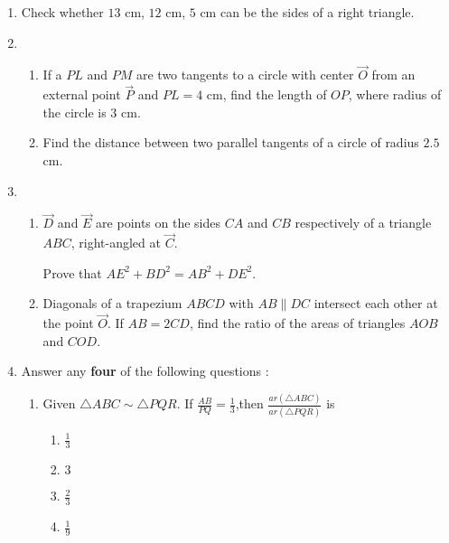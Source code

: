 %
\begin{enumerate}[label=\thesection.\arabic*.,ref=\thesection.\theenumi]
\item Check whether $13$ cm, $12$ cm, $5$ cm can be the sides of a right triangle.
\item \begin{enumerate}
    \item If a $PL$ and $PM$ are two tangents to a circle with center $\vec{O}$ from an external point $\vec{P}$ and $PL=4$ cm, find the length of $OP$, where radius of the circle is $3$ cm.
    \item Find the distance between two parallel tangents of a circle of radius $2.5$ cm.
\end{enumerate}
    \item 
    \begin{enumerate}
    \item $\vec{D}$ and $\vec{E}$ are points on the sides $CA$ and $CB$ respectively of  a triangle $ABC$, right-angled at $\vec{C}$.
    
    Prove that $AE^2+BD^2=AB^2+DE^2$.
    
    \item Diagonals of a trapezium $ABCD$ with $AB\parallel DC$ intersect each other at the point $\vec{O}$. If $AB=2CD$, find the ratio of the areas of triangles $AOB$ and $COD$.
    \end{enumerate}

    \item Answer any \textbf{four} of the following questions :
      \begin{enumerate}[label=(\roman*)]
        \item Given $\triangle ABC \sim \triangle PQR$. If $\frac{AB}{PQ}=\frac{1}{3}$,then $\frac{ar(\triangle ABC)}{ar(\triangle PQR)}$ is 
        \begin{enumerate}[label=(\Alph*)]
            \item $\frac{1}{3}$
            \item $3$
            \item $\frac{2}{3}$
            \item $\frac{1}{9}$
        \end{enumerate}
        

\end{enumerate}
\end{enumerate}
